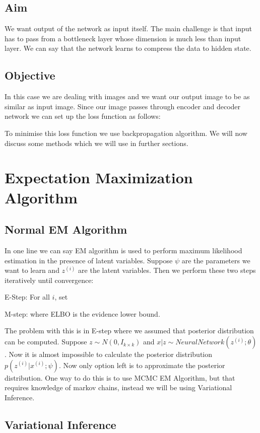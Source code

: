 \documentclass[10pt,a4paper,twoside]{tau-book}
\begin{document}
\subsection{Aim}
We want output of the network as input itself. The main challenge is that input has to pass from a bottleneck layer whose dimension is much less than input layer. We can say that the network learns to compress the data to hidden state.

\subsection{Objective}
In this case we are dealing with images and we want our output image to be as similar as input image. Since our image passes through encoder and decoder network we can set up the loss function as follows:


To minimise this loss function we use backpropagation algorithm. We will now discuss some methods which we will use in further sections.

\section{Expectation Maximization Algorithm}
\subsection{Normal EM Algorithm}
In one line we can say EM algorithm is used to perform maximum likelihood estimation in the presence of latent variables. Suppose $\psi$ are the parameters we want to learn and $z^{(i)}$ are the latent variables. Then we perform these two steps iteratively until convergence:

E-Step: For all $i$, set 

M-step:  where ELBO is the evidence lower bound.

The problem with this is in E-step where we assumed that posterior distribution can be computed. Suppose $z \sim N(0,I_{k \times k})$ and $x | z \sim NeuralNetwork(z^{(i)};\theta)$. Now it is almost impossible to calculate the posterior distribution $p(z^{(i)}|x^{(i)}; \psi)$. Now only option left is to approximate the posterior distribution. One way to do this is to use MCMC EM Algorithm, but that requires knowledge of markov chains, instead we will be using Variational Inference.

\subsection{Variational Inference}
\end{document}
